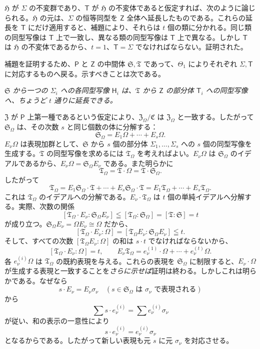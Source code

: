 $\mathfrak H$ が $\Sigma$ の不変群であり、$\mathsf T$ が $\mathfrak H$ の不変体であると仮定すれば、次のように論じられる。$\mathfrak H$ の元は、$\Sigma$ の恒等同型を $\mathsf Z$ 全体へ延長したものである。これらの延長を $\mathsf T$ にだけ適用すると、補題により、それらは $t$ 個の類に分かれる。同じ類の同型写像は $\mathsf T$ 上で一致し、異なる類の同型写像は $\mathsf T$ 上で異なる。しかし $\mathsf T$ は $\mathfrak H$ の不変体であるから、$t=1$、$\mathsf T=\Sigma$ でなければならない。証明された。

補題を証明するため、$\mathsf P$ と $\mathsf Z$ の中間体 $\mathfrak S,\mathfrak T$ であって、$\Theta_1$ によりそれぞれ $\Sigma,\mathsf T$ に対応するものへ戻る。示すべきことは次である。

\emph{$\mathfrak S$ から一つの $\Sigma_i$ への各同型写像 $\mathsf{H}_i$ は、$\mathfrak T$ から $\mathsf Z$ の部分体 $\mathsf T_i$ への同型写像へ、ちょうど $t$ 通りに延長できる。}

$\mathfrak Z$ が $\mathsf P$ 上第一種であるという仮定により、$\mathfrak Z_\Omega/\mathfrak C$ は $\mathfrak Z_\Omega$ と一致する。したがって $\mathfrak S_\Omega$ は、その次数 $s$ と同じ個数の体に分解する：
\[
\mathfrak S_\Omega = E_1\Omega+\cdots+E_s\Omega .
\]
$E_\nu\Omega$ は表現加群として、$\mathfrak S$ から $s$ 個の部分体 $\Sigma_1,\ldots,\Sigma_s$ への $s$ 個の同型写像を生成する。$\mathfrak T$ の同型写像を求めるには $\mathfrak T_\Omega$ を考えればよい。$E_\nu\Omega$ は $\mathfrak S_\Omega$ のイデアルであるから、$E_\nu\Omega=\mathfrak S_\Omega E_\nu$ である。また明らかに
\[
\mathfrak T_\Omega=\mathfrak T\cdot\Omega=\mathfrak T\cdot\mathfrak S_\Omega .
\]
したがって
\[
\mathfrak T_\Omega
=E_1\mathfrak S_\Omega\cdot\mathfrak T+\cdots+E_s\mathfrak S_\Omega\cdot\mathfrak T
=E_1\mathfrak T_\Omega+\cdots+E_s\mathfrak T_\Omega .
\]
これは $\mathfrak T_\Omega$ のイデアルへの分解である。$E_\nu\cdot\mathfrak T_\Omega$ は $t$ 個の単純イデアルへ分解する。実際、次数の関係
\[
[\mathfrak T_\Omega\cdot E_\nu:\mathfrak S_\Omega E_\nu]
\leqq [\mathfrak T_\Omega:\mathfrak S_\Omega]=[\mathfrak T:\mathfrak S]=t
\]
が成り立つ。$\mathfrak S_\Omega E_\nu=\Omega E_\nu\cong\Omega$ だから、
\[
[\mathfrak T_\Omega\cdot E_\nu:\Omega]
=[\mathfrak T_\Omega E_\nu:\mathfrak S_\Omega E_\nu]\leqq t.
\]
そして、すべての次数 $[\mathfrak T_\Omega E_\nu:\Omega]$ の和は $s\cdot t$ でなければならないから、
\[
[\mathfrak T_\Omega\cdot E_\nu:\Omega]=t,\qquad
E_\nu\mathfrak T_\Omega=e_\nu^{(1)}\cdot\Omega+\cdots+e_\nu^{(t)}\Omega .
\]
各 $e_\nu^{(i)}\Omega$ は $\mathfrak T_\Omega$ の既約表現を与える。これらの表現を $\mathfrak S_\Omega$ に制限すると、$E_\nu\cdot\Omega$ が生成する表現と一致することを\emph{さらに示せば}証明は終わる。しかしこれは明らかである。なぜなら
\[
s\cdot E_\nu=E_\nu\sigma_\nu\quad
(s\in\mathfrak S_\Omega\text{ は $\sigma_\nu$ で表現される})
\]
から
\[
\sum s\cdot e_\nu^{(i)}=\sum e_\nu^{(i)}\sigma_\nu
\]
が従い、和の表示の一意性により
\[
s\cdot e_\nu^{(i)}=e_\nu^{(i)}\sigma_\nu
\]
となるからである。したがって新しい表現も元 $s$ に元 $\sigma_\nu$ を対応させる。

